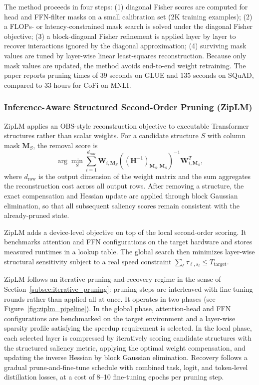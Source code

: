 The method proceeds in four steps: (1) diagonal Fisher scores are computed for head and FFN-filter masks on a small calibration set (2K training examples); (2) a FLOPs- or latency-constrained mask search is solved under the diagonal Fisher objective; (3) a block-diagonal Fisher refinement is applied layer by layer to recover interactions ignored by the diagonal approximation; (4) surviving mask values are tuned by layer-wise linear least-squares reconstruction. Because only mask values are updated, the method avoids end-to-end weight retraining. The paper reports pruning times of 39 seconds on GLUE and 135 seconds on SQuAD, compared to 33 hours for CoFi on MNLI.

\methodsep

\subsubsection{Inference-Aware Structured Second-Order Pruning (ZipLM)}

ZipLM \cite{kurtic2023ziplm} applies an OBS-style reconstruction objective to executable Transformer structures rather than scalar weights. For a candidate structure $S$ with column mask $\mathbf{M}_S$, the removal score is
\begin{equation}
	\arg\min_S
	\sum_{i=1}^{d_{\text{row}}}
	\mathbf{W}_{i,\mathbf{M}_S}
	\left(\left(\mathbf{H}^{-1}\right)_{\mathbf{M}_S,\mathbf{M}_S}\right)^{-1}
	\mathbf{W}_{i,\mathbf{M}_S}^{T},
\end{equation}
where $d_{\text{row}}$ is the output dimension of the weight matrix and the sum aggregates the reconstruction cost across all output rows. After removing a structure, the exact compensation and Hessian update are applied through block Gaussian elimination, so that all subsequent saliency scores remain consistent with the already-pruned state.

ZipLM adds a device-level objective on top of the local second-order scoring. It benchmarks attention and FFN configurations on the target hardware and stores measured runtimes in a lookup table. The global search then minimizes layer-wise structural sensitivity subject to a real speed constraint $\sum_\ell \tau_{\ell,s_\ell} \leq T_{\text{target}}$.

ZipLM follows an iterative pruning-and-recovery regime in the sense of Section~\ref{subsec:iterative_pruning}: pruning steps are interleaved with fine-tuning rounds rather than applied all at once. It operates in two phases (see Figure~\ref{fig:ziplm_pipeline}). In the global phase, attention-head and FFN configurations are benchmarked on the target environment and a layer-wise sparsity profile satisfying the speedup requirement is selected. In the local phase, each selected layer is compressed by iteratively scoring candidate structures with the structured saliency metric, applying the optimal weight compensation, and updating the inverse Hessian by block Gaussian elimination. Recovery follows a gradual prune-and-fine-tune schedule with combined task, logit, and token-level distillation losses, at a cost of 8--10 fine-tuning epochs per pruning step.

